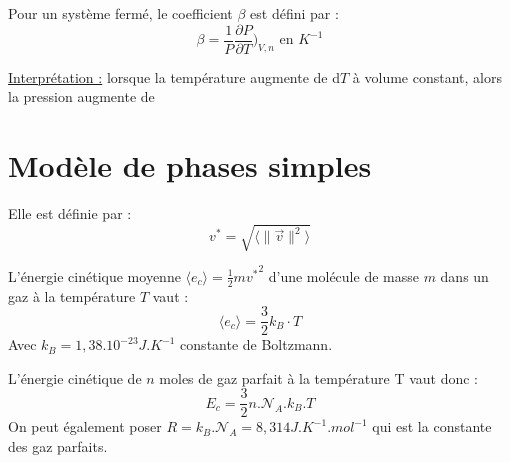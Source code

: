 \documentclass[12pt]{article}
\theoremstyle{cstyle}{\newtheorem{definition}{Définition}[section]}
\theoremstyle{cstyle}{\newtheorem{proposition}[definition]{Propriété}}
\theoremstyle{mystyle}{\newtheorem{theorem}[definition]{Théorème}}
\theoremstyle{mystyle}{\newtheorem{lemma}[definition]{Lemme}}
\theoremstyle{mystyle}{\newtheorem{corollary}[definition]{Corollaire}}
\theoremstyle{mystyle}{\newtheorem*{remark}{Remarque}}
\theoremstyle{mystyle}{\newtheorem*{remarks}{Remarques}}
\theoremstyle{mystyle}{\newtheorem*{example}{Exemple}}
\theoremstyle{mystyle}{\newtheorem*{examples}{Exemples}}
\theoremstyle{definition}{\newtheorem*{exercise}{Exercice}}
\theoremstyle{mystyle}{\newtheorem*{methode}{Méthode}}
\theoremstyle{cstyle}{\newtheorem*{cthm}{}}
\theoremstyle{warn}
\begin{document}
\begin{minipage}[t]{0.45\textwidth}
	\begin{definition}
		Pour un système fermé, le coefficient $\beta$ est défini par :
		\[
		\beta = \frac{1}{P} \frac{\partial P}{\partial T}\Big)_{V,n} \text{ en } K^{-1}
		\]
		
		\underline{Interprétation :} lorsque la température augmente de d$T$ à volume constant, alors la pression augmente de 
	\end{definition}

	\section{Modèle de phases simples}
	
	\begin{definition}
		Elle est définie par :
		\[
			v^* = \sqrt{\langle \| \vec{v} \|^2 \rangle}
		\]
	\end{definition}

	\begin{proposition}
		L'énergie cinétique moyenne $\langle e_c \rangle = \frac{1}{2}m{v^*}^2$ d'une molécule de masse $m$ dans un gaz à la température $T$ vaut :
		\[
		\langle e_c \rangle = \frac{3}{2} k_B \cdot T
		\]
		Avec $k_B = 1,38.10^{-23} J.K^{-1}$ constante de Boltzmann.
		
		L'énergie cinétique de $n$ moles de gaz parfait à la température T vaut donc :
		\[
		E_c = \frac{3}{2} n.\mathcal{N}_A.k_B.T
		\]
		On peut également poser $R = k_B. \mathcal{N}_A = 8,314J.K^{-1}.mol^{-1}$ qui est la constante des gaz parfaits.
	\end{proposition}
\end{minipage}
\end{document}
